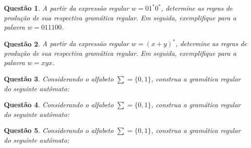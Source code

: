 \documentclass{article}
\newtheorem{problem}{Questão}
\begin{document}
        \begin{problem}
           A partir da expressão regular $w = 01^{*}0^{*}$, determine as regras de produção de sua respectiva gramática regular. Em seguida, exemplifique para a palavra $w = 011100$.
        \end{problem}
        \begin{solution}
        
    \end{solution}
        \begin{problem}
           A partir da expressão regular $w = (x+y)^{*}$, determine as regras de produção de sua respectiva gramática regular. Em seguida, exemplifique para a palavra $w = xyx$.
        \end{problem}
        \begin{solution}
        
    \end{solution}
        \begin{problem}
        Considerando o alfabeto $\sum = \{ 0, 1\}$, construa a gramática regular do seguinte autômato:
    
        
        \end{problem}
        \begin{solution}
        
    \end{solution}
         \begin{problem}
        Considerando o alfabeto $\sum = \{ 0, 1\}$, construa a gramática regular do seguinte autômato:
        
        
        \end{problem}
        \begin{solution}
        
    \end{solution}
         \begin{problem}
        Considerando o alfabeto $\sum = \{ 0, 1\}$, construa a gramática regular do seguinte autômato:
        
        
        \end{problem}
    \begin{solution}
        
    \end{solution}
    
\end{document}
